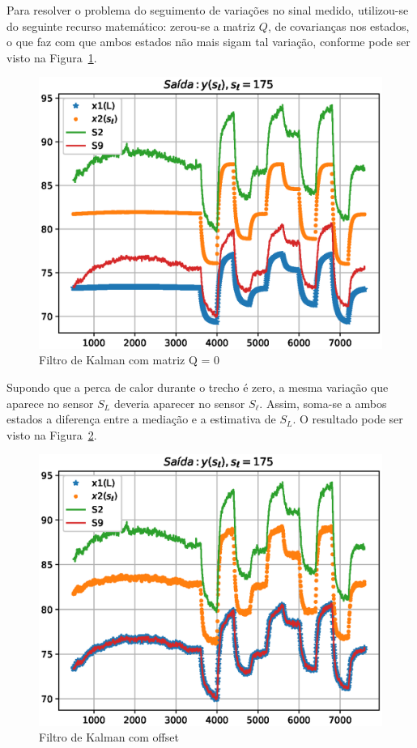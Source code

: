 Para resolver o problema do seguimento de variações no sinal medido, utilizou-se
do seguinte recurso matemático: zerou-se a matriz \(Q\), de covarianças nos
estados, o que faz com que ambos estados não mais sigam tal variação, conforme
pode ser visto na Figura~\ref{fig:kalman-Q0}.

\begin{figure}[ht!]
	\centering
	\captionsetup{justification=centering}
	\includegraphics[height=0.5\linewidth]{imgs/kalman-Q0}
	\caption{Filtro de Kalman com matriz Q = 0}%
	\label{fig:kalman-Q0}
\end{figure}

Supondo que a perca de calor durante o trecho é zero, a mesma variação que
aparece no sensor \(S_L\) deveria aparecer no sensor \(S_{\ell}\). Assim,
soma-se a ambos estados a diferença entre a mediação e a estimativa de \(S_L\).
O resultado pode ser visto na Figura~\ref{fig:kalman-offset}.

\begin{figure}[ht!]
	\centering
	\captionsetup{justification=centering}
	\includegraphics[height=0.5\linewidth]{imgs/kalman-offset}
	\caption{Filtro de Kalman com offset}%
	\label{fig:kalman-offset}
\end{figure}

